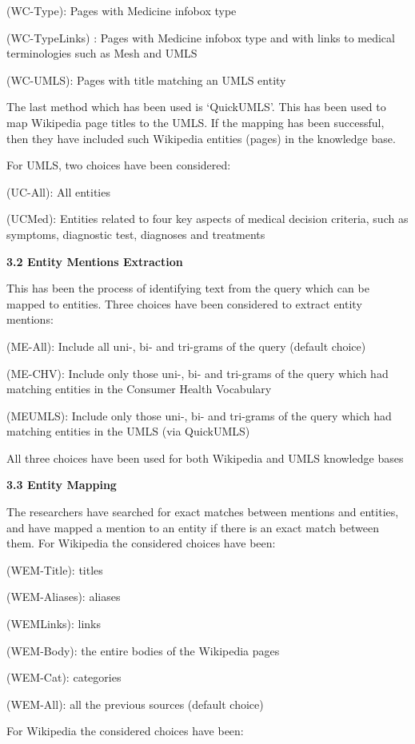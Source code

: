 \documentclass[]{article}
\begin{document}
(WC-Type): Pages with Medicine infobox type

(WC-TypeLinks) : Pages with Medicine infobox type and with links to medical terminologies such as Mesh and UMLS 

(WC-UMLS): Pages with title matching an UMLS entity  
 
The last method which has been used is ‘QuickUMLS’. This has been used to map Wikipedia page titles to the UMLS. If the mapping has been successful, then they have included such Wikipedia entities (pages) in the knowledge base.
  
For UMLS, two choices have been considered:

(UC-All): All entities 

(UCMed): Entities related to four key aspects of medical decision criteria, such as symptoms, diagnostic test, diagnoses and treatments

\textbf{3.2 Entity Mentions Extraction} 

This has been the process of identifying text from the query which can be mapped to entities. Three choices have been considered to extract entity mentions:

(ME-All): Include all uni-, bi- and tri-grams of the query (default choice)

(ME-CHV): Include only those uni-, bi- and tri-grams of the query which had matching entities in the Consumer Health Vocabulary 

(MEUMLS): Include only those uni-, bi- and tri-grams of the query which had matching entities in the UMLS (via QuickUMLS)
  
All three choices have been used for both Wikipedia and UMLS knowledge bases

\textbf{3.3 Entity Mapping}

The researchers have searched for exact matches between mentions and entities, and have mapped a mention to an entity if there is an exact match between them. For Wikipedia the considered choices have been:  

(WEM-Title): titles

(WEM-Aliases): aliases

(WEMLinks): links

(WEM-Body): the entire bodies of the Wikipedia pages

(WEM-Cat): categories

(WEM-All): all the previous sources (default choice)


For Wikipedia the considered choices have been: 
 
\end{document}
